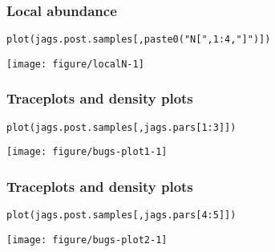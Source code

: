 \documentclass[color=usenames,dvipsnames]{beamer}\usepackage[]{graphicx}\usepackage[]{xcolor}
\makeatletter
\newcommand{\hlnum}[1]{\textcolor[rgb]{0.69,0.494,0}{#1}}%
\newcommand{\hlsng}[1]{\textcolor[rgb]{0.749,0.012,0.012}{#1}}%
\newcommand{\hlopt}[1]{\textcolor[rgb]{0,0,0}{#1}}%
\newcommand{\hldef}[1]{\textcolor[rgb]{0,0,0}{#1}}%
\newcommand{\hlkwd}[1]{\textcolor[rgb]{0.004,0.004,0.506}{#1}}%
\newenvironment{kframe}{%
 \def\at@end@of@kframe{}%
 \ifinner\ifhmode%
  \def\at@end@of@kframe{\end{minipage}}%
  \begin{minipage}{\columnwidth}%
 \fi\fi%
 \def\FrameCommand##1{\hskip\@totalleftmargin \hskip-\fboxsep
 \colorbox{shadecolor}{##1}\hskip-\fboxsep
     \hskip-\linewidth \hskip-\@totalleftmargin \hskip\columnwidth}%
 \MakeFramed {\advance\hsize-\width
   \@totalleftmargin\z@ \linewidth\hsize
   \@setminipage}}%
 {\par\unskip\endMakeFramed%
 \at@end@of@kframe}
\newenvironment{knitrout}{}{} %
\makeatother
\begin{document}
\begin{frame}[fragile]
  \frametitle{Local abundance}
\begin{knitrout}\scriptsize
{}\color{fgcolor}\begin{kframe}
\begin{alltt}
\hlkwd{plot}\hldef{(jags.post.samples[,}\hlkwd{paste0}\hldef{(}\hlsng{"N["}\hldef{,} \hlnum{1}\hlopt{:}\hlnum{4}\hldef{,} \hlsng{"]"}\hldef{)])}
\end{alltt}
\end{kframe}

{\centering \texttt{[image: figure/localN-1]} 

}


\end{knitrout}
\end{frame}



\begin{frame}[fragile]
  \frametitle{Traceplots and density plots}
\begin{knitrout}\footnotesize
{}\color{fgcolor}\begin{kframe}
\begin{alltt}
\hlkwd{plot}\hldef{(jags.post.samples[,jags.pars[}\hlnum{1}\hlopt{:}\hlnum{3}\hldef{]])}
\end{alltt}
\end{kframe}

{\centering \texttt{[image: figure/bugs-plot1-1]} 

}


\end{knitrout}
\end{frame}



\begin{frame}[fragile]
  \frametitle{Traceplots and density plots}
\begin{knitrout}\footnotesize
{}\color{fgcolor}\begin{kframe}
\begin{alltt}
\hlkwd{plot}\hldef{(jags.post.samples[,jags.pars[}\hlnum{4}\hlopt{:}\hlnum{5}\hldef{]])}
\end{alltt}
\end{kframe}

{\centering \texttt{[image: figure/bugs-plot2-1]} 

}


\end{knitrout}
\end{frame}
\end{document}
